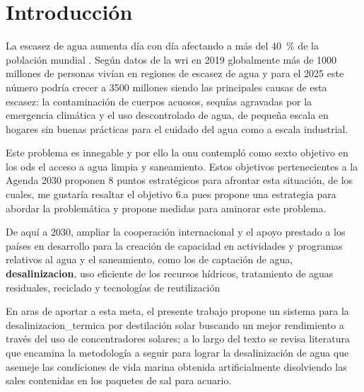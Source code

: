\chapter{Introducción}
	
	La escasez de agua aumenta día con día afectando a más del \qty{40}{\percent} de la población mundial \cite{pnud_objetivo_nodate}. Según datos de la \acrfull{wri} en 2019 globalmente más de 1000 millones de personas vivían en regiones de escasez de agua y para el 2025 este número podría crecer a 3500 millones siendo las principales causas de esta escasez: la contaminación de cuerpos acuosos, sequías agravadas por la emergencia climática y el uso descontrolado de agua, de pequeña escala en hogares sin buenas prácticas para el cuidado del agua como a escala industrial.
	
	Este problema es innegable y por ello la \acrfull{onu} contempló como sexto objetivo en los \acrfull{ods} el acceso a agua limpia y saneamiento. Estos objetivos pertenecientes a la Agenda 2030 proponen 8 puntos estratégicos para afrontar esta situación, de los cuales, me gustaría resaltar el objetivo 6.a pues propone una estrategia para abordar la problemática y propone medidas para aminorar este problema.
	
	\begin{displayquote}[][.]
		De aquí a 2030, ampliar la cooperación internacional y el apoyo prestado a los países en desarrollo para la creación de capacidad en actividades y programas relativos al agua y el saneamiento, como los de captación de agua, \textbf{\gls{desalinizacion}}, uso eficiente de los recursos hídricos, tratamiento de aguas residuales, reciclado y tecnologías de reutilización \cite{naciones_unidas_sustainable_nodate}
	\end{displayquote}

	En aras de aportar a esta meta, el presente trabajo propone un sistema para la \gls{desalinizacion_termica} por destilación solar buscando un mejor rendimiento a través del uso de concentradores solares; a lo largo del texto se revisa literatura que encamina la metodología a seguir para lograr la desalinización de agua que asemeje las condiciones de vida marina obtenida artificialmente disolviendo las sales contenidas en los paquetes de sal para acuario.
	
	
	